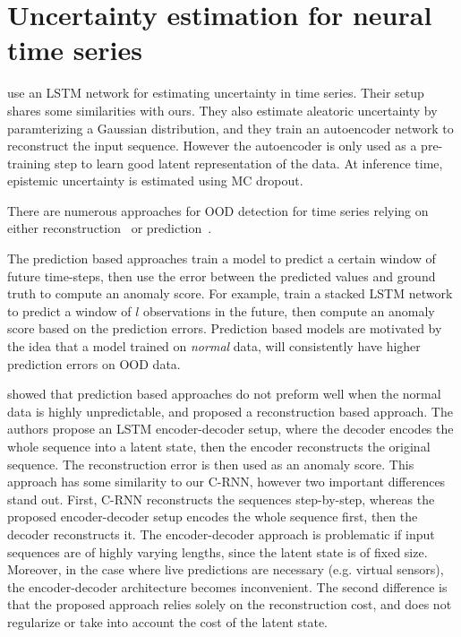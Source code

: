 \documentclass[../main.tex]{subfiles}
\begin{document}
\section{Uncertainty estimation for neural time series}

\citet{zhu2017deep} use an LSTM network for estimating uncertainty in time series. Their setup shares some similarities with ours. They also estimate aleatoric uncertainty by paramterizing a Gaussian distribution, and they train an autoencoder network to reconstruct the input sequence. However the autoencoder is only used as a pre-training step to learn good latent representation of the data. At inference time, epistemic uncertainty is estimated using MC dropout. 

There are numerous approaches for OOD detection for time series relying on either reconstruction~\citep{guo2018multidimensional, chen2019vaelstm, marchi2015novel, yoo2019convolutional, malhotra2016lstm} or prediction~\citep{taylor2016anomaly, malhotra2015long, munir2018deepant, buda2018deepad, nanduri2016anomaly, hundman2018detecting}.

The prediction based approaches train a model to predict a certain window of future time-steps, then use the error between the predicted values and ground truth to compute an anomaly score. For example, \citet{malhotra2015long} train a stacked LSTM network to predict a window of $l$ observations in the future, then compute an anomaly score based on the prediction errors. Prediction based models are motivated by the idea that a model trained on \emph{normal} data, will consistently have higher prediction errors on OOD data. 

\citet{malhotra2016lstm} showed that prediction based approaches do not preform well when the normal data is highly unpredictable, and proposed a reconstruction based approach. The authors propose an LSTM encoder-decoder setup, where the decoder encodes the whole sequence into a latent state, then the encoder reconstructs the original sequence. The reconstruction error is then used as an anomaly score. This approach has some similarity to our C-RNN, however two important differences stand out. First, C-RNN reconstructs the sequences step-by-step, whereas the proposed encoder-decoder setup encodes the whole sequence first, then the decoder reconstructs it. The encoder-decoder approach is problematic if input sequences are of highly varying lengths, since the latent state is of fixed size. Moreover, in the case where live predictions are necessary (e.g. virtual sensors), the encoder-decoder architecture becomes inconvenient. The second difference is that the proposed approach relies solely on the reconstruction cost, and does not regularize or take into account the cost of the latent state. 
\end{document}
